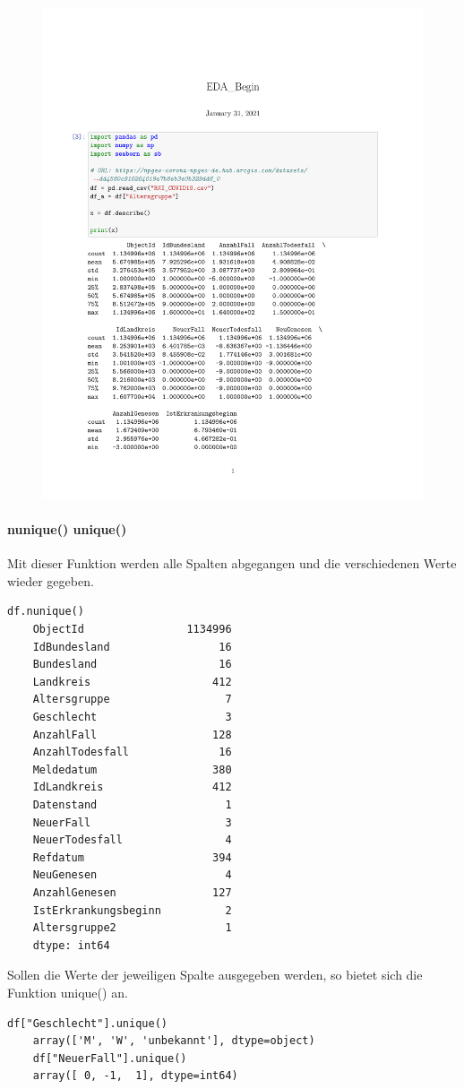 \begin{figure}[H]
	\centering
	\includegraphics[scale = 0.8]{attachment/chapter_3/Scc078}
\end{figure} 

\paragraph{nunique() unique()}
Mit dieser Funktion werden alle Spalten abgegangen und die verschiedenen Werte wieder gegeben.
\begin{lstlisting}[style=python]
	df.nunique()
	ObjectId                1134996
	IdBundesland                 16
	Bundesland                   16
	Landkreis                   412
	Altersgruppe                  7
	Geschlecht                    3
	AnzahlFall                  128
	AnzahlTodesfall              16
	Meldedatum                  380
	IdLandkreis                 412
	Datenstand                    1
	NeuerFall                     3
	NeuerTodesfall                4
	Refdatum                    394
	NeuGenesen                    4
	AnzahlGenesen               127
	IstErkrankungsbeginn          2
	Altersgruppe2                 1
	dtype: int64
\end{lstlisting}
Sollen die Werte der jeweiligen Spalte ausgegeben werden, so bietet sich die Funktion unique() an.
\begin{lstlisting}[style=python]
	df["Geschlecht"].unique()
	array(['M', 'W', 'unbekannt'], dtype=object)
	df["NeuerFall"].unique()
	array([ 0, -1,  1], dtype=int64)
\end{lstlisting}

